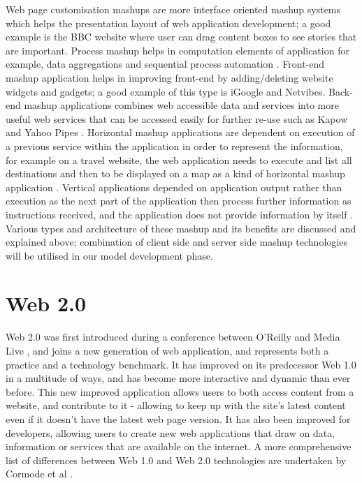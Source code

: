 Web page customisation mashups are more interface oriented mashup systems which helps the presentation layout of web application development; a good example is the BBC website where user can drag content boxes to see stories that are important. Process mashup helps in computation elements of application for example, data aggregations and sequential process automation \cite{de2009process}. Front-end mashup application helps in improving front-end by adding/deleting website widgets and gadgets; a good example of this type is iGoogle and Netvibes. Back-end mashup applications combines web accessible data and services into more useful web services that can be accessed easily for further re-use such as Kapow and Yahoo Pipes \cite{pipes}. Horizontal mashup applications are dependent on execution of a previous service within the application in order to represent the information, for example on a travel website, the web application needs to execute and list all destinations and then to be displayed on a map as a kind of horizontal mashup application \cite{zhao2012design}. Vertical applications depended on application output rather than execution as the next part of the application then process further information as instructions received, and the application does not provide information by itself \cite{zhao2012design}. Various types and architecture of these mashup and its benefits are discussed and explained above; combination of client side and server side mashup technologies will be utilised in our model development phase.

\section{Web 2.0}

Web 2.0 was first introduced during a conference between O'Reilly and Media Live \cite{o2009web}, and joins a new generation of web application, and represents both a practice and a technology benchmark. It has improved on its predecessor Web 1.0 in a multitude of ways, and has become more interactive and dynamic than ever before. This new improved application allows users to both access content from a website, and contribute to it - allowing to keep up with the site's latest content even if it doesn't have the latest web page version. It has also been improved for developers, allowing users to create new web applications that draw on data, information or services that are available on the internet. A more comprehensive list of differences between Web 1.0 and Web 2.0 technologies are undertaken by Cormode et al \cite{cormode2008key}. 

